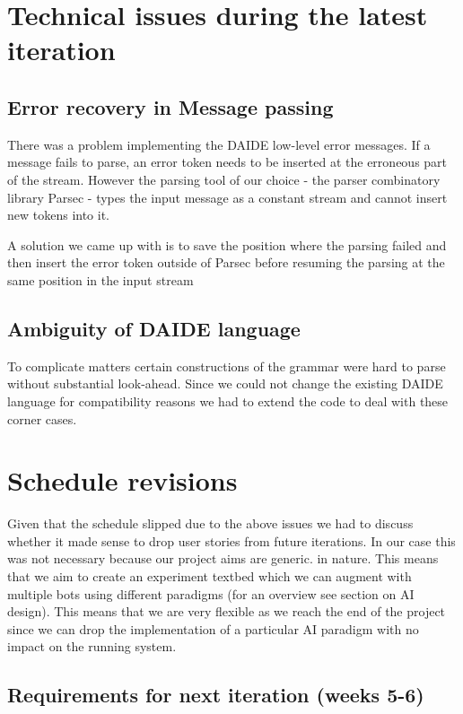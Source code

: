\documentclass[12pt]{article}
\begin{document}
\begin{itemize}
\begin{itemize}
\end{itemize}

\section{Technical issues during the latest iteration}

\subsection{Error recovery in Message passing}

There was a problem implementing the DAIDE low-level error messages.
If a message fails to parse, an error token needs to be inserted at
the erroneous part of the stream. However the parsing tool of our choice - 
the parser combinatory library Parsec - types the input message
as a constant stream and cannot insert new tokens into it.

A solution we came up with is to save the position where the parsing
failed and then insert the error token outside of Parsec before resuming
the parsing at the same position in the input stream

\subsection{Ambiguity of DAIDE language}

To complicate matters certain constructions of the grammar were hard to
parse without substantial look-ahead. Since we could not change the existing
DAIDE language for compatibility reasons we had to extend the code to deal
with these corner cases.

\section{Schedule revisions}

Given that the schedule slipped due to the above issues we had to 
discuss whether it made sense to drop user stories from future iterations. 
In our case this was not necessary because our project aims are generic.
in nature. This means that we aim to create an experiment textbed which we can augment
with multiple bots using different paradigms (for an overview see section
on AI design). This means that we are very flexible as we reach the end of 
the project since we can drop the implementation of a particular AI paradigm
with no impact on the running system. 

\subsection{Requirements for next iteration (weeks 5-6)}
 

\end{itemize}
\end{document}
